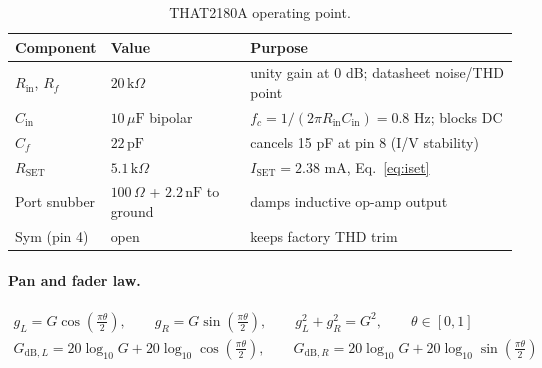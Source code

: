 \documentclass[11pt, letterpaper,titlepage]{article}
\begin{document}
\begin{table}[H]
    \centering
    \begin{tabular}{@{}lll@{}}
        \toprule
        Component & Value & Purpose \\
        \midrule
        $R_\text{in}$, $R_f$ & $20\,\mathrm{k}\Omega$ & unity gain at 0 dB; datasheet noise/THD point \\
        $C_\text{in}$ & $10\,\mu\mathrm{F}$ bipolar & $f_c = 1/(2\pi R_\text{in} C_\text{in}) = 0.8$ Hz; blocks DC \\
        $C_f$ & $22\,\mathrm{pF}$ & cancels 15 pF at pin 8 (I/V stability) \\
        $R_\text{SET}$ & $5.1\,\mathrm{k}\Omega$ & $I_\text{SET} = 2.38$ mA, Eq.~\eqref{eq:iset} \\
        Port snubber & $100\,\Omega$ + $2.2\,\mathrm{nF}$ to ground & damps inductive op-amp output \\
        Sym (pin 4) & open & keeps factory THD trim \\
        \bottomrule
    \end{tabular}
    \caption{THAT2180A operating point.}
    \label{tab:vca-op}
\end{table}

\paragraph{Pan and fader law.}
\begin{gather}
    g_L = G\cos\!\left(\tfrac{\pi\theta}{2}\right), \qquad
    g_R = G\sin\!\left(\tfrac{\pi\theta}{2}\right), \qquad
    g_L^2 + g_R^2 = G^2, \qquad \theta \in [0,1]
    \label{eq:panlaw}\\
    G_{\text{dB},L} = 20\log_{10}G + 20\log_{10}\cos\!\left(\tfrac{\pi\theta}{2}\right), \qquad
    G_{\text{dB},R} = 20\log_{10}G + 20\log_{10}\sin\!\left(\tfrac{\pi\theta}{2}\right)
    \label{eq:panlaw-db}
\end{gather}
\end{document}
